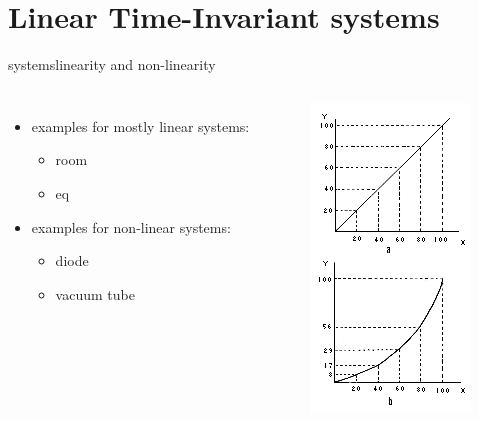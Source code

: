     \section[LTI]{Linear Time-Invariant systems}
        \begin{frame}{systems}{linearity and non-linearity}
            \begin{columns}
            \begin{itemize}
                \item   examples for mostly linear systems:
                    \begin{itemize}
                        \item   room
                        \item   eq
                    \end{itemize}
                \bigskip
                \item   examples for non-linear systems:
                    \begin{itemize}
                        \item   diode
                        \item   vacuum tube
                    \end{itemize}
            \end{itemize}
            \begin{figure}%
                \includegraphics[scale=.75]{graph/linearnonlinear}%
            \end{figure}
            \end{columns}

        \end{frame}

